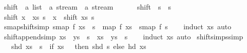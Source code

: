 \begin{isabellebody}
%
\isadelimdocument
%
\endisadelimdocument
%
\isatagdocument
%
\isamarkuptrue%
%
\endisatagdocument
{\isafolddocument}%
%
\isadelimdocument
%
\endisadelimdocument
{}\isamarkupfalse%
\ shift\ {\isacharcolon}{\isacharcolon}\ {\isachardoublequoteopen}{\isacharprime}a\ list\ {\isasymRightarrow}\ {\isacharprime}a\ stream\ {\isasymRightarrow}\ {\isacharprime}a\ stream{\isachardoublequoteclose}\ {\isacharparenleft}\ {\isacartoucheopen}{\isacharat}{\isacharminus}{\isacartoucheclose}\ {}{}{\isacharparenright}\ \isanewline
\ \ {\isachardoublequoteopen}shift\ {\isacharbrackleft}{\isacharbrackright}\ s\ {\isacharequal}\ s{\isachardoublequoteclose}\isanewline
{\isacharbar}\ {\isachardoublequoteopen}shift\ {\isacharparenleft}x\ {\isacharhash}\ xs{\isacharparenright}\ s\ {\isacharequal}\ x\ {\isacharhash}{\isacharhash}\ shift\ xs\ s{\isachardoublequoteclose}\isanewline
\isanewline
{}\isamarkupfalse%
\ smap{\isacharunderscore}shift{\isacharbrackleft}simp{\isacharbrackright}{\isacharcolon}\ {\isachardoublequoteopen}smap\ f\ {\isacharparenleft}xs\ {\isacharat}{\isacharminus}\ s{\isacharparenright}\ {\isacharequal}\ map\ f\ xs\ {\isacharat}{\isacharminus}\ smap\ f\ s{\isachardoublequoteclose}\isanewline
%
\isadelimproof
\ \ %
\endisadelimproof
%
\isatagproof
{}\isamarkupfalse%
\ {\isacharparenleft}induct\ xs{\isacharparenright}\ auto%
\endisatagproof
{\isafoldproof}%
%
\isadelimproof
\isanewline
%
\endisadelimproof
\isanewline
{}\isamarkupfalse%
\ shift{\isacharunderscore}append{\isacharbrackleft}simp{\isacharbrackright}{\isacharcolon}\ {\isachardoublequoteopen}{\isacharparenleft}xs\ {\isacharat}\ ys{\isacharparenright}\ {\isacharat}{\isacharminus}\ s\ {\isacharequal}\ xs\ {\isacharat}{\isacharminus}\ ys\ {\isacharat}{\isacharminus}\ s{\isachardoublequoteclose}\isanewline
%
\isadelimproof
\ \ %
\endisadelimproof
%
\isatagproof
{}\isamarkupfalse%
\ {\isacharparenleft}induct\ xs{\isacharparenright}\ auto%
\endisatagproof
{\isafoldproof}%
%
\isadelimproof
\isanewline
%
\endisadelimproof
\isanewline
{}\isamarkupfalse%
\ shift{\isacharunderscore}simps{\isacharbrackleft}simp{\isacharbrackright}{\isacharcolon}\isanewline
\ \ \ {\isachardoublequoteopen}shd\ {\isacharparenleft}xs\ {\isacharat}{\isacharminus}\ s{\isacharparenright}\ {\isacharequal}\ {\isacharparenleft}if\ xs\ {\isacharequal}\ {\isacharbrackleft}{\isacharbrackright}\ then\ shd\ s\ else\ hd\ xs{\isacharparenright}{\isachardoublequoteclose}\isanewline

\end{isabellebody}
